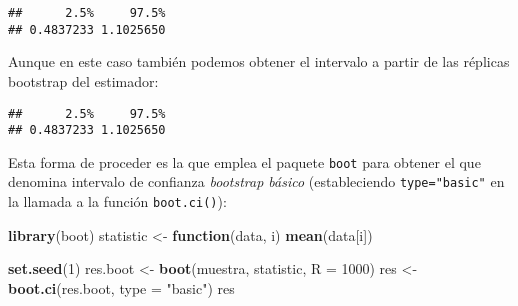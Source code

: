 \documentclass[
]{book}
\newenvironment{Shaded}{\begin{snugshade}}{\end{snugshade}}
\newcommand{\ControlFlowTok}[1]{\textcolor[rgb]{0.13,0.29,0.53}{\textbf{#1}}}
\newcommand{\DataTypeTok}[1]{\textcolor[rgb]{0.13,0.29,0.53}{#1}}
\newcommand{\DecValTok}[1]{\textcolor[rgb]{0.00,0.00,0.81}{#1}}
\newcommand{\KeywordTok}[1]{\textcolor[rgb]{0.13,0.29,0.53}{\textbf{#1}}}
\newcommand{\NormalTok}[1]{#1}
\newcommand{\OperatorTok}[1]{\textcolor[rgb]{0.81,0.36,0.00}{\textbf{#1}}}
\newcommand{\StringTok}[1]{\textcolor[rgb]{0.31,0.60,0.02}{#1}}
\theoremstyle{break}
\theoremstyle{definition}
\theoremstyle{definition}
\theoremstyle{definition}
\theoremstyle{remark}
\begin{document}
\begin{verbatim}
##      2.5%     97.5% 
## 0.4837233 1.1025650
\end{verbatim}

Aunque en este caso también podemos obtener el intervalo a
partir de las réplicas bootstrap del estimador:

\begin{Shaded}
\end{Shaded}

\begin{verbatim}
##      2.5%     97.5% 
## 0.4837233 1.1025650
\end{verbatim}

Esta forma de proceder es la que emplea el paquete \texttt{boot} para obtener
el que denomina intervalo de confianza \emph{bootstrap básico}
(estableciendo \texttt{type="basic"} en la llamada a la función \texttt{boot.ci()}):

\begin{Shaded}
\begin{Highlighting}[]
\KeywordTok{library}\NormalTok{(boot)}
\NormalTok{statistic <-}\StringTok{ }\ControlFlowTok{function}\NormalTok{(data, i) }\KeywordTok{mean}\NormalTok{(data[i])}

\KeywordTok{set.seed}\NormalTok{(}\DecValTok{1}\NormalTok{)}
\NormalTok{res.boot <-}\StringTok{ }\KeywordTok{boot}\NormalTok{(muestra, statistic, }\DataTypeTok{R =} \DecValTok{1000}\NormalTok{)}
\NormalTok{res <-}\StringTok{ }\KeywordTok{boot.ci}\NormalTok{(res.boot, }\DataTypeTok{type =} \StringTok{"basic"}\NormalTok{)}
\NormalTok{res}
\end{Highlighting}
\end{Shaded}
\end{document}
